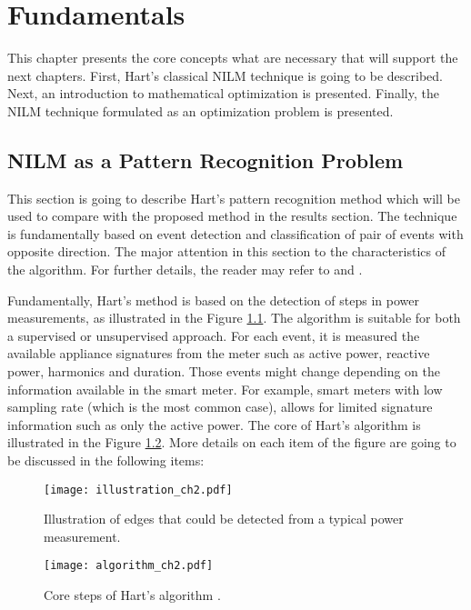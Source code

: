 \chapter{Fundamentals}

This chapter presents the core concepts what are necessary that will support the next chapters. First, Hart's classical NILM technique is going to be described. Next, an introduction to mathematical optimization is presented. Finally, the NILM technique formulated as an optimization problem is presented. 

\section{NILM as a Pattern Recognition Problem}
This section is going to describe Hart's pattern recognition method which will be used to compare with the proposed method in the results section. The technique is fundamentally based on event detection and classification of pair of events with opposite direction. The major attention in this section to the characteristics of the algorithm. For further details, the reader may refer to \cite{hart} and \cite{hart85}. 

Fundamentally, Hart's method is based on the detection of steps in power measurements, as illustrated in the Figure \ref{illustration_ch2}. The algorithm is suitable for both a supervised or unsupervised approach. For each event, it is measured the available appliance signatures from the meter such as active power, reactive power, harmonics and duration. Those events might change depending on the information available in the smart meter. For example, smart meters with low sampling rate (which is the most common case), allows for limited signature information such as only the active power. The core of Hart's algorithm is illustrated in the Figure \ref{algorithm_ch2}. More details on each item of the figure are going to be discussed in the following items:

\begin{figure}[htb]
    \centering
    \texttt{[image: illustration\_ch2.pdf]}
    \caption{Illustration of edges that could be detected from a typical power measurement.}
    \label{illustration_ch2}
\end{figure}



\begin{figure}[htb]
    \centering
    \texttt{[image: algorithm\_ch2.pdf]}
    \caption{Core steps of Hart's algorithm \cite{hart}.}
    \label{algorithm_ch2}
\end{figure}

